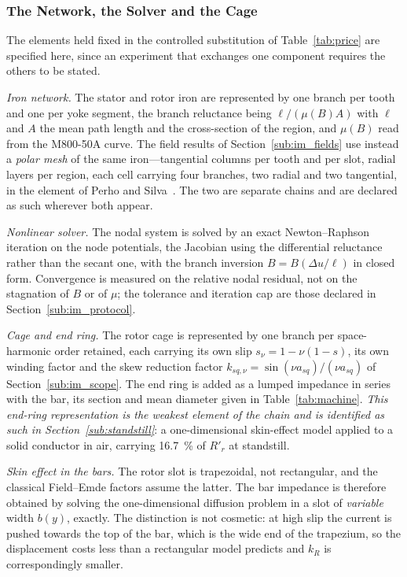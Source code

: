 \documentclass[10pt,a4paper,twocolumn]{article}
\theoremstyle{plain}
\theoremstyle{remark}
\begin{document}
\subsubsection{The Network, the Solver and the Cage}
\label{sub:im_network}

The elements held fixed in the controlled substitution of
Table~\ref{tab:price} are specified here, since an experiment that
exchanges one component requires the others to be stated.

\emph{Iron network.} The stator and rotor iron are represented by one
branch per tooth and one per yoke segment, the branch reluctance being
$\ell/(\mu(B)A)$ with $\ell$ and $A$ the mean path length and the
cross-section of the region, and $\mu(B)$ read from the M800-50A curve.
The field results of Section~\ref{sub:im_fields} use instead a
\emph{polar mesh} of the same iron---tangential columns per tooth and
per slot, radial layers per region, each cell carrying four branches,
two radial and two tangential, in the element of Perho and
Silva~\cite{perho2002,silva2023}. The two are separate chains and are
declared as such wherever both appear.

\emph{Nonlinear solver.} The nodal system is solved by an exact
Newton--Raphson iteration on the node potentials, the Jacobian using the
differential reluctance rather than the secant one, with the branch
inversion $B=B(\Delta u/\ell)$ in closed form. Convergence is measured
on the relative nodal residual, not on the stagnation of $B$ or of
$\mu$; the tolerance and iteration cap are those declared in
Section~\ref{sub:im_protocol}.

\emph{Cage and end ring.} The rotor cage is represented by one branch
per space-harmonic order retained, each carrying its own slip
$s_\nu=1-\nu(1-s)$, its own winding factor and the skew reduction factor
$k_{sq,\nu}=\sin(\nu a_{sq})/(\nu a_{sq})$ of
Section~\ref{sub:im_scope}. The end ring is added as a lumped impedance
in series with the bar, its section and mean diameter given in
Table~\ref{tab:machine}. \emph{This end-ring representation is the
weakest element of the chain and is identified as such in
Section~\ref{sub:standstill}}: a one-dimensional skin-effect model
applied to a solid conductor in air, carrying \SI{16.7}{\percent} of
$R'_r$ at standstill.

\emph{Skin effect in the bars.} The rotor slot is trapezoidal, not
rectangular, and the classical Field--Emde factors assume the latter.
The bar impedance is therefore obtained by solving the one-dimensional
diffusion problem in a slot of \emph{variable} width $b(y)$, exactly.
The distinction is not cosmetic: at high slip the current is pushed
towards the top of the bar, which is the wide end of the trapezium, so
the displacement costs less than a rectangular model predicts and
$k_R$ is correspondingly smaller.
\end{document}
